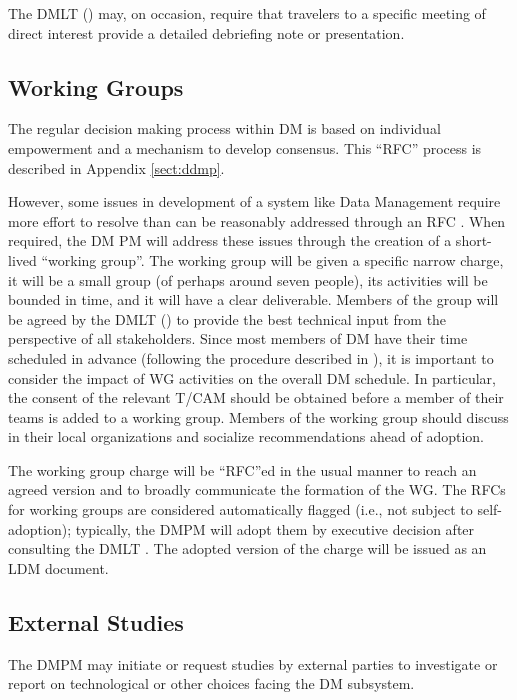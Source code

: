 The DMLT  () may, on occasion, require that travelers to a specific meeting of direct interest provide a detailed debriefing note or presentation.

\subsection {Working Groups} \label{sect:wgs}

The regular decision making process within DM is based on individual empowerment and a mechanism to develop consensus.
This ``RFC'' process is described in Appendix \ref{sect:ddmp}.

However, some issues in development of a system like \gls{Data Management} require more effort to resolve than can be reasonably addressed through an RFC .
When required, the DM PM  will address these issues through the creation of a short-lived ``working group''.
The working group will be given a specific narrow charge, it will be a small group (of perhaps around seven people), its activities will be bounded in time, and it will have a clear deliverable.
Members of the group will be agreed by the DMLT () to provide the best technical input from the perspective of all stakeholders.
Since most members of DM have their time scheduled in advance (following the procedure described in ), it is important to consider the impact of \gls{WG} activities on the overall DM schedule.
In particular, the consent of the relevant \gls{T/CAM} should be obtained before a member of their teams is added to a working group.
Members of the working group should discuss in their local organizations and socialize recommendations ahead of adoption.

The working group charge will be ``RFC''ed in the usual manner to reach an agreed version and to broadly communicate the formation of the \gls{WG}.
The RFCs for working groups are considered automatically flagged (i.e., not
subject to self-adoption); typically, the DMPM  will adopt them by executive
decision after consulting the DMLT .  The adopted version of the charge will be issued as an LDM document.

\subsection {External Studies} \label{sect:studies}

The DMPM  may initiate or request studies by external parties to investigate or report on technological or other choices facing the DM subsystem.

